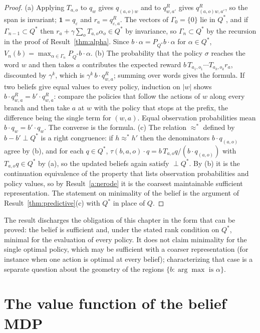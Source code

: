 \begin{proof}
(a) Applying $T_{a,o}$ to $q_w$ gives $q_{(a,o)w}$ and to $q^{R}_{w,a'}$ gives $q^{R}_{(a,o)w,a'}$, so the span is invariant; $\mathbf 1=q_\varepsilon$ and $r_a=q^{R}_{\varepsilon,a}$. The vectors of $\Gamma_0=\{0\}$ lie in $Q^{*}$, and if $\Gamma_{n-1}\subset Q^{*}$ then $r_a+\gamma\sum_oT_{a,o}\alpha_o\in Q^{*}$ by invariance, so $\Gamma_n\subset Q^{*}$ by the recursion in the proof of Result~\ref{thm:alpha}. Since $b\cdot\alpha=P_{Q^{*}}b\cdot\alpha$ for $\alpha\in Q^{*}$, $V_n(b)=\max_{\alpha\in\Gamma_n}P_{Q^{*}}b\cdot\alpha$. (b) The probability that the policy $\sigma$ reaches the word $w$ and then takes $a$ contributes the expected reward $b\,T_{a_1,o_1}\cdots T_{a_k,o_k}r_a$, discounted by $\gamma^{k}$, which is $\gamma^{k}\,b\cdot q^{R}_{w,a}$; summing over words gives the formula. If two beliefs give equal values to every policy, induction on $|w|$ shows $b\cdot q^{R}_{w,a}=b'\cdot q^{R}_{w,a}$: compare the policies that follow the actions of $w$ along every branch and then take $a$ at $w$ with the policy that stops at the prefix, the difference being the single term for $(w,a)$. Equal observation probabilities mean $b\cdot q_w=b'\cdot q_w$. The converse is the formula. (c) The relation $\approx^{*}$ defined by $b-b'\perp Q^{*}$ is a right congruence: if $h\approx^{*}h'$ then the denominators $b\cdot q_{(a,o)}$ agree by (b), and for each $q\in Q^{*}$, $\tau(b,a,o)\cdot q=b\,T_{a,o}q/(b\cdot q_{(a,o)})$ with $T_{a,o}q\in Q^{*}$ by (a), so the updated beliefs again satisfy $\perp Q^{*}$. By (b) it is the continuation equivalence of the property that lists observation probabilities and policy values, so by Result~\ref{a:nerode} it is the coarsest maintainable sufficient representation. The statement on minimality of the belief is the argument of Result~\ref{thm:predictive}(c) with $Q^{*}$ in place of $Q$.
\end{proof}

The result discharges the obligation of this chapter in the form that can be proved: the belief is sufficient and, under the stated rank condition on $Q^{*}$, minimal for the evaluation of every policy. It does not claim minimality for the single optimal policy, which may be sufficient with a coarser representation (for instance when one action is optimal at every belief); characterizing that case is a separate question about the geometry of the regions $\{b:\arg\max\text{ is }\alpha\}$.

\section{The value function of the belief MDP}\label{sec:alpha}

